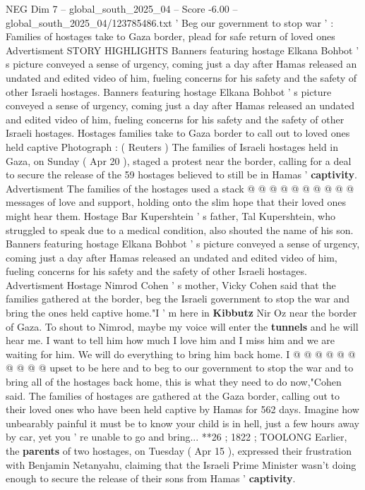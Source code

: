 \begin{textsample}{NEG Dim 7 – global\_south\_2025\_04 – Score -6.00 – global\_south\_2025\_04/123785486.txt}  \label{ex:f7_neg_303}
' Beg our government to stop war ' : Families of hostages take to Gaza border, plead for safe return of loved ones Advertisment STORY HIGHLIGHTS Banners featuring hostage Elkana Bohbot ' s picture conveyed a sense of urgency, coming just a day after Hamas released an undated and edited video of him, fueling concerns for his safety and the safety of other Israeli hostages.
Banners featuring hostage Elkana Bohbot ' s picture conveyed a sense of urgency, coming just a day after Hamas released an undated and edited video of him, fueling concerns for his safety and the safety of other Israeli hostages.
Hostages families take to Gaza border to call out to loved ones held captive Photograph : ( Reuters ) The families of Israeli hostages held in Gaza, on Sunday ( Apr 20 ), staged a protest near the border, calling for a deal to secure the release of the 59 hostages believed to still be in Hamas ' \textbf{captivity}.
Advertisment The families of the hostages used a stack @ @ @ @ @ @ @ @ @ @ messages of love and support, holding onto the slim hope that their loved ones might hear them.
Hostage Bar Kupershtein ' s father, Tal Kupershtein, who struggled to speak due to a medical condition, also shouted the name of his son.
Banners featuring hostage Elkana Bohbot ' s picture conveyed a sense of urgency, coming just a day after Hamas released an undated and edited video of him, fueling concerns for his safety and the safety of other Israeli hostages.
Advertisment Hostage Nimrod Cohen ' s mother, Vicky Cohen said that the families gathered at the border, beg the Israeli government to stop the war and bring the ones held captive home."I ' m here in \textbf{Kibbutz} Nir Oz near the border of Gaza.
To shout to Nimrod, maybe my voice will enter the \textbf{tunnels} and he will hear me.
I want to tell him how much I love him and I miss him and we are waiting for him.
We will do everything to bring him back home.
I @ @ @ @ @ @ @ @ @ @ upset to be here and to beg to our government to stop the war and to bring all of the hostages back home, this is what they need to do now,"Cohen said.
The families of hostages are gathered at the Gaza border, calling out to their loved ones who have been held captive by Hamas for 562 days.
Imagine how unbearably painful it must be to know your child is in hell, just a few hours away by car, yet you ' re unable to go and bring... **26 ; 1822 ; TOOLONG Earlier, the \textbf{parents} of two hostages, on Tuesday ( Apr 15 ), expressed their frustration with Benjamin Netanyahu, claiming that the Israeli Prime Minister wasn't doing enough to secure the release of their sons from Hamas ' \textbf{captivity}.

\end{textsample}
